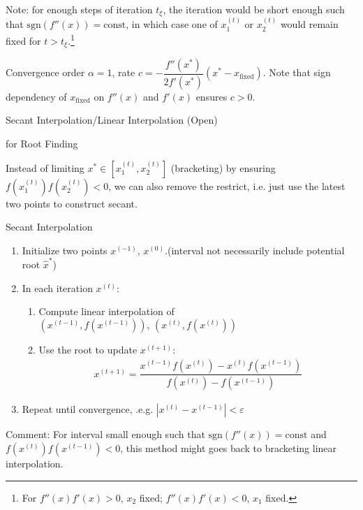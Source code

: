     Note: for enough steps of iteration $ t_\xi  $, the iteration would be short enough such that $ \mathrm{sgn}(f''(x))=\mathrm{const} $, in which case one of $ x_1^{(t)} $ or $ x_2^{(t)} $ would remain fixed for $ t>t_\xi  $.\footnote{For $ f''(x)f'(x)>0 $, $ x_2 $ fixed; $ f''(x)f'(x)<0 $, $ x_1 $ fixed.}

    Convergence order $ \alpha =1 $, rate $ c=-\dfrac{f''(x^*)}{2f'(x^*)}(x^*-x_\mathrm{fixed} ) $. Note that sign dependency of $ x_\mathrm{fixed}  $  on $ f''(x) $ and $ f'(x) $ ensures $ c>0 $.

\begin{point}
    \hypertarget{Secant}{Secant Interpolation/Linear Interpolation (Open)} for Root Finding
\end{point}    

    Instead of limiting $ x^*\in[x_1^{(t)},x_2^{(t)}] $ (bracketing) by ensuring $ f(x_1^{(t)})f(x_2^{(t)})<0 $, we can also remove the restrict, i.e. just use the latest two points to construct secant.

\begin{algorithm}{Secant Interpolation}

\begin{enumerate}[topsep=2pt,itemsep=2pt]
    \item Initialize two points  $ x^{(-1)},\,x^{(0)} $.(interval not necessarily include potential root $ \hat{x}^* $)
    \item In each iteration $ x^{(t)} $:
    \begin{enumerate}[topsep=2pt,itemsep=2pt]
        \item Compute linear interpolation of $ (x^{(t-1)},f(x^{(t-1)})),\,(x^{(t)},f(x^{(t)})) $
        \item Use the root to update $ x^{(t+1)} $:
    \begin{align}
        x^{(t+1)}=\dfrac{x^{(t-1)}f(x^{(t)})-x^{(t)}f(x^{(t-1)})}{f(x^{(t)})-f(x^{(t-1)})}
    \end{align}
    \end{enumerate}
    
    \item Repeat until convergence, .e.g. $ |x^{(t)}-x^{(t-1)}|<\varepsilon  $
\end{enumerate}

   
\end{algorithm}
    

    Comment: For interval small enough such that $ \mathrm{sgn}(f''(x))=\mathrm{const} $ and $ f(x^{(t)})f(x^{(t-1)})<0 $, this method might goes back to bracketing linear interpolation.

